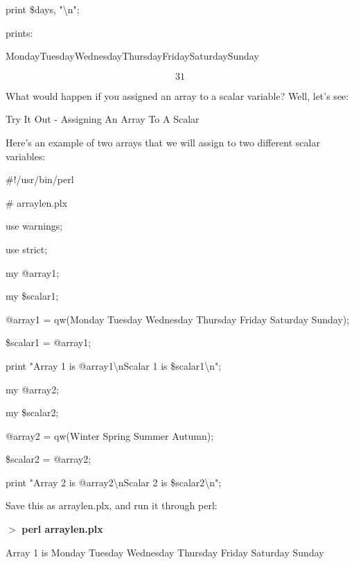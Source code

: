 \documentclass[a4paper,11pt]{book}
\begin{document}
\noindent print \$days, "\textbackslash n";

\noindent 

\noindent prints:

\noindent 

\noindent MondayTuesdayWednesdayThursdayFridaySaturdaySunday

\[31\] 


\noindent What would happen if you assigned an array to a scalar variable? Well, let's see:

\noindent 

\noindent Try It Out - Assigning An Array To A Scalar

\noindent 

\noindent Here's an example of two arrays that we will assign to two different scalar variables:

\noindent 

\noindent \#!/usr/bin/perl

\noindent \# arraylen.plx

\noindent use warnings;

\noindent use strict;

\noindent 

\noindent my @array1;

\noindent my \$scalar1;

\noindent @array1 = qw(Monday Tuesday Wednesday Thursday Friday Saturday Sunday);

\noindent \$scalar1 = @array1;

\noindent 

\noindent print "Array 1 is @array1\textbackslash nScalar 1 is \$scalar1\textbackslash n";

\noindent 

\noindent my @array2;

\noindent my \$scalar2;

\noindent @array2 = qw(Winter Spring Summer Autumn);

\noindent \$scalar2 = @array2;

\noindent 

\noindent print "Array 2 is @array2\textbackslash nScalar 2 is \$scalar2\textbackslash n";

\noindent 

\noindent Save this as arraylen.plx, and run it through perl:

\noindent 

\noindent $>$ \textbf{perl arraylen.plx}

\noindent Array 1 is Monday Tuesday Wednesday Thursday Friday Saturday Sunday
\end{document}
